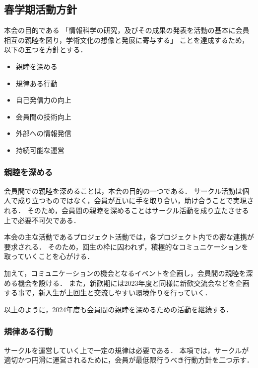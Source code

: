 \subsection*{春学期活動方針}


本会の目的である
「情報科学の研究，及びその成果の発表を活動の基本に会員相互の親睦を図り，学術文化の想像と発展に寄与する」
ことを達成するため，以下の五つを方針とする．

\begin{itemize}
  \item 親睦を深める
  \item 規律ある行動
  \item 自己発信力の向上
  \item 会員間の技術向上
  \item 外部への情報発信
  \item 持続可能な運営
\end{itemize}

\subsubsection*{親睦を深める}
会員間での親睦を深めることは，本会の目的の一つである．
サークル活動は個人で成り立つものではなく，会員が互いに手を取り合い，助け合うことで実現される．
そのため，会員間の親睦を深めることはサークル活動を成り立たさせる上で必要不可欠である．

本会の主な活動であるプロジェクト活動では，各プロジェクト内での密な連携が要求される．
そのため，回生の枠に囚われず，積極的なコミュニケーションを取っていくことを心がける．

加えて，コミュニケーションの機会となるイベントを企画し，会員間の親睦を深める機会を設ける．
また，新歓期には2023年度と同様に新歓交流会などを企画する事で，新入生が上回生と交流しやすい環境作りを行っていく．

以上のように，2024年度も会員間の親睦を深めるための活動を継続する．

\subsubsection*{規律ある行動}
サークルを運営していく上で一定の規律は必要である．
本項では，サークルが適切かつ円滑に運営されるために，会員が最低限行うべき行動方針を二つ示す．

